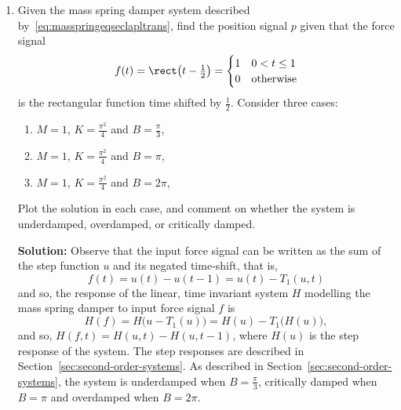 \documentclass[11pt,a4paper]{book}
\theoremstyle{plain}
\numberwithin{equation}{section}
\newenvironment{solution}{\begin{footnotesize}\textbf{Solution:}}{\end{footnotesize}}
\newenvironment{excersizelist}{%
  \renewcommand*{\theenumi}{\thechapter.\arabic{enumi}}%
  \newcommand\itemadvanced{\stepcounter{enumi}\item[$\ast$\, \theenumi.]}
  \begin{enumerate}
}{%
  \end{enumerate}
}
\begin{document}
\begin{excersizelist}
\item \label{exer:massspringdamperrect} Given the mass spring damper system described by~\eqref{eq:masspringeqseclapltrans}, find the position signal $p$ given that the force signal 
\[
f(t) = \rect\big(t-\tfrac{1}{2}\big) = \begin{cases}
1 & 0 < t \leq 1 \\
0 & \text{otherwise}
\end{cases}
\]
is the rectangular function time shifted by $\tfrac{1}{2}$.  Consider three cases:
\begin{enumerate}
\item $M=1$, $K=\tfrac{\pi^2}{4}$ and $B=\tfrac{\pi}{3}$,
\item $M=1$, $K=\tfrac{\pi^2}{4}$ and $B=\pi$,
\item $M=1$, $K=\tfrac{\pi^2}{4}$ and $B=2\pi$,
\end{enumerate}
Plot the solution in each case, and comment on whether the system is underdamped, overdamped, or critically damped. 
\begin{solution}
Observe that the input force signal can be written as the sum of the step function $u$ and its negated time-shift, that is,
\[
f(t) = u(t) - u(t - 1) = u(t) - T_{1}(u,t)
\]
and so, the response of the linear, time invariant system $H$ modelling the mass spring damper to input force signal $f$ is
\[
H(f) = H\big(u - T_{1}(u)\big) = H(u) - T_{1}\big(H(u)\big),
\]
and so, $H(f,t) = H(u,t) - H(u,t-1)$, where $H(u)$ is the step response of the system.  The step responses are described in Section~\ref{sec:second-order-systems}.  As described in Section~\ref{sec:second-order-systems}, the system is underdamped when $B = \tfrac{\pi}{3}$, critically damped when $B = \pi$ and overdamped when $B = 2\pi$.
\end{solution}


\end{excersizelist}
\end{document}
